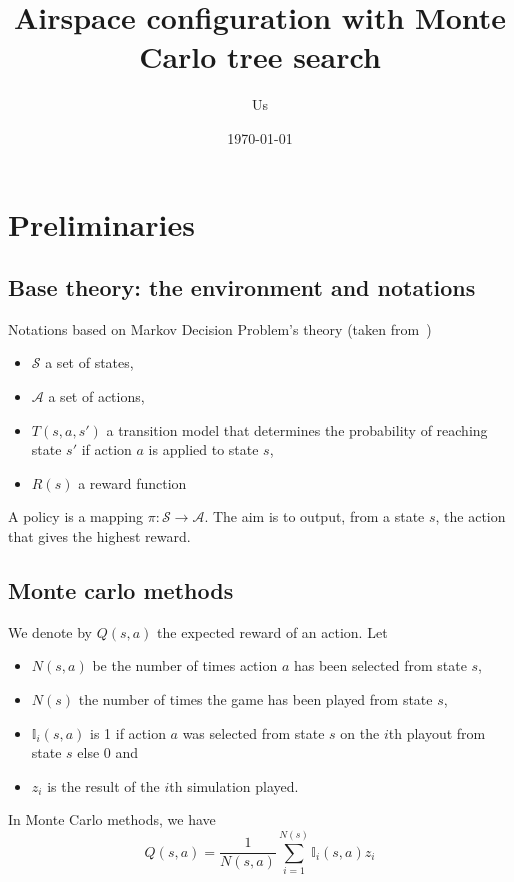 \documentclass{article}
\title{Airspace configuration with Monte Carlo tree search}
\author{Us}
\date{\today}
\begin{document}
\maketitle

\section{Preliminaries}
\subsection{Base theory: the environment and notations}
Notations based on Markov Decision Problem's theory (taken
from~\cite{browne2012survey})
\begin{itemize}
  \item \(\mathcal{S}\) a set of states,
  \item \(\mathcal{A}\) a set of actions,
  \item \(T(s, a, s')\) a transition model that determines the probability of
      reaching state \(s'\) if action \(a\) is applied to state \(s\),
  \item \(R(s)\) a reward function
\end{itemize}

A policy is a mapping \(\pi \colon \mathcal{S} \to \mathcal{A}\). The aim is to
output, from a state \(s\), the action that gives the highest reward.

\subsection{Monte carlo methods~\cite{browne2012survey}}
We denote by \(Q(s, a)\) the expected reward of an action. Let
\begin{itemize}
  \item \(N(s, a)\) be
    the number of times action \(a\) has been selected from state \(s\),
  \item \(N(s)\) the number of times the game has been played from state \(s\),
  \item \(\mathbb{I}_i(s, a)\) is 1 if action \(a\) was selected from state
    \(s\) on the \(i\)th playout from state \(s\) else 0 and
  \item \(z_i\) is the result of the \(i\)th simulation played.
\end{itemize}
In Monte Carlo methods, we have
\begin{equation}
  Q(s, a) = \frac{1}{N(s, a)}\sum_{i = 1}^{N(s)}\mathbb{I}_i(s, a)z_i
\end{equation}
\end{document}
